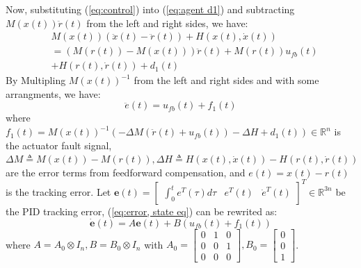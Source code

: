 \documentclass{ieeeaccess}
\newtheorem{remark}{Remark}
\begin{document}
Now, substituting (\ref{eq:control}) into (\ref{eq:agent d1}) and subtracting $M(x(t))\ddot{r}(t)$ from the left and right sides, we have:
\begin{equation} \label{eq:agent1}
    \begin{split}
        & M(x(t))(\ddot{x}(t)-\ddot{r}(t)) + H(x(t),\dot{x}(t)) \\
        & =(M(r(t))-M(x(t)))\ddot{r}(t) + M(r(t))u_{fb}(t) \\
        & + H(r(t),\dot{r}(t)) + d_1(t)
    \end{split}
\end{equation}
By Multipling $M(x(t))^{-1}$ from the left and right sides and with some arrangments, we have:
\begin{equation} \label{eq:error, state eq}
    \ddot{e}(t) = u_{fb}(t) + f_1(t)
\end{equation}
where $f_1(t) = M(x(t))^{-1}(-\Delta M (\ddot{r}(t)+u_{fb}(t)) -\Delta H + d_1(t))\in\mathbb{R}^n$ is the actuator fault signal, $\Delta M \triangleq M(x(t)) - M(r(t)), \Delta H \triangleq H(x(t),\dot{x}(t)) - H(r(t),\dot{r}(t))$ are the error terms from feedforward compensation, and $e(t)= x(t)-r(t)$ is the tracking error.
Let $\pmb{e}(t)=\begin{bmatrix}
    \int_{0}^{t}e^T(\tau)d\tau & e^T(t) & \dot{e}^T(t)
\end{bmatrix}^T\in\mathbb{R}^{3n}$ be the PID tracking error, (\ref{eq:error, state eq}) can be rewrited as:
\begin{equation} \label{eq:linear f1}
    \dot{\pmb{e}}(t)=A\pmb{e}(t)+B(u_{fb}(t)+f_1(t))
\end{equation}
where $ A = A_0\otimes I_n, B = B_0\otimes I_n$
with $A_0 = \begin{bmatrix}
    0 & 1 & 0 \\ 0 & 0 & 1 \\ 0 & 0 & 0
\end{bmatrix}, B_0 = \begin{bmatrix}
0 \\ 0 \\ 1
\end{bmatrix}$. 
\end{document}

